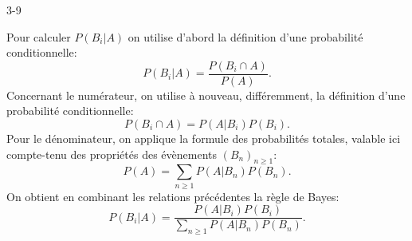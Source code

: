 \begin{corrige}{3-9}

Pour calculer $P(B_i|A)$ on utilise d'abord la définition d'une probabilité conditionnelle:
\[
 P(B_i|A) = \frac{P(B_i \cap A)}{P(A)}.
\]
Concernant le numérateur, on utilise à nouveau, différemment, la définition d'une probabilité conditionnelle:
\[
 P(B_i \cap A) = P(A|B_i)P(B_i).
\]
Pour le dénominateur, on applique la formule des probabilités totales, valable ici compte-tenu des propriétés des évènements $(B_n)_{n\geq1}$:
\[
 P(A) = \sum_{n\geq1} P(A|B_n)P(B_n).
\]
On obtient en combinant les relations précédentes la règle de Bayes:
\[
 P(B_i|A) = \frac{P(A|B_i)P(B_i)}{\sum_{n\geq1} P(A|B_n)P(B_n)}.
\]



\end{corrige}
